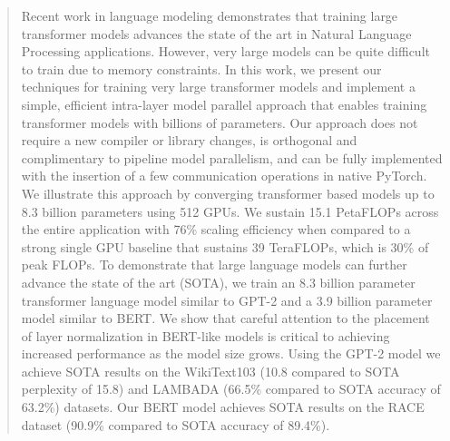 \begin{abstract}

Recent work in language modeling demonstrates that training large transformer models advances the state of the art in Natural Language Processing applications. However, very large models can be quite difficult to train due to memory constraints. In this work, we present our techniques for training very large transformer models and implement a simple, efficient intra-layer model parallel approach that enables training transformer models with billions of parameters. Our approach does not require a new compiler or library changes, is orthogonal and complimentary to pipeline model parallelism, and can be fully implemented with the insertion of a few communication operations in native PyTorch. We illustrate this approach by converging transformer based models up to 8.3 billion parameters using 512 GPUs. We sustain 15.1 PetaFLOPs  across the entire application with 76\% scaling efficiency when compared to a strong single GPU baseline that sustains 39 TeraFLOPs, which is 30\% of peak FLOPs. To demonstrate that large language models can further advance the state of the art (SOTA), we train an 8.3 billion parameter transformer language model similar to GPT-2 and a 3.9 billion parameter model similar to BERT. We show that careful attention to the placement of layer normalization in BERT-like models is critical to achieving increased performance as the model size grows. Using the GPT-2 model we achieve SOTA results on the WikiText103 (10.8 compared to SOTA perplexity of 15.8) and LAMBADA (66.5\% compared to SOTA accuracy of 63.2\%) datasets. Our BERT model achieves SOTA results on the RACE dataset (90.9\% compared to SOTA accuracy of 89.4\%).
  
\end{abstract}
